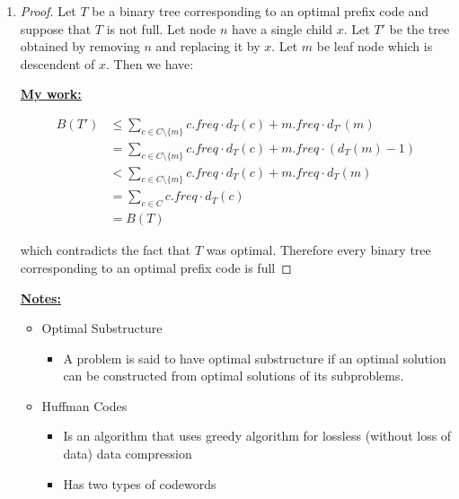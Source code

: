 \documentclass[12pt]{article}
\begin{document}
\begin{enumerate}[1.]
    \item
    \setcounter{equation}{0}

    \begin{proof}

    Let $T$ be a binary tree corresponding to an optimal prefix code and suppose
    that $T$ is not full. Let node $n$ have a single child $x$. Let $T'$ be the
    tree obtained by removing $n$ and replacing it by $x$. Let $m$ be leaf node
    which is descendent of $x$. Then we have:


    \begin{mdframed}
    \underline{\textbf{My work:}}

    \begin{align}
    B(T') &\leq \sum\limits_{c \in C \setminus \{m\}} c.freq \cdot d_T(c) + m.freq \cdot d_{T'}(m)\\
    &= \sum\limits_{c \in C \setminus \{m\}} c.freq \cdot d_T(c) + m.freq \cdot (d_T(m) - 1)\\
    &< \sum\limits_{c \in C \setminus \{m\}} c.freq \cdot d_T(c) + m.freq \cdot d_T(m)\\
    &= \sum\limits_{c \in C} c.freq \cdot d_T(c)\\
    &= B(T)
    \end{align}

    \end{mdframed}

    which contradicts the fact that $T$ was optimal. Therefore every binary tree
    corresponding to an optimal prefix code is full

    \end{proof}

    \underline{\textbf{Notes:}}

    \bigskip

    \begin{itemize}
        \item Optimal Substructure

        \begin{itemize}
            \item A problem is said to have optimal substructure if an optimal solution
            can be constructed from optimal solutions of its subproblems.
        \end{itemize}

        \item Huffman Codes

        \begin{itemize}
            \item Is an algorithm that uses greedy algorithm for lossless (without loss of data) data compression
            \item Has two types of codewords


\end{itemize}
\end{itemize}
\end{enumerate}
\end{document}
